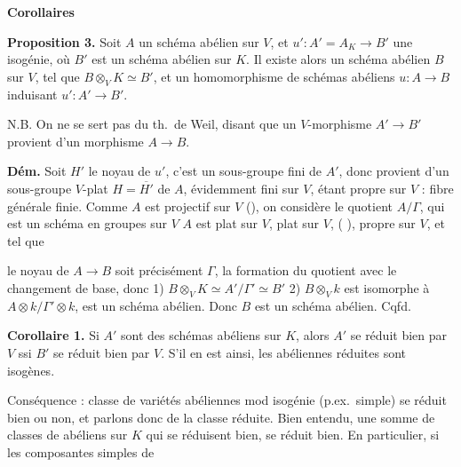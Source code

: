 \documentclass[11pt,a4paper]{article}
\begin{document}
\textbf{Corollaires}

\textbf{Proposition 3.} Soit $A$ un schéma abélien sur $V$, et
$u' \colon A' = A_K \to B'$ une isogénie, où $B'$ est un schéma abélien sur
$K$. Il existe alors un schéma abélien $B$ sur $V$, \struck{\ill{}} tel
que $B \otimes_V K \simeq B'$, et un 
homomorphisme  de schémas abéliens $u \colon A \to B$ induisant
$u' \colon A' \to B'$.

N.B. On ne se sert pas du th.\ de Weil, disant que un $V$-morphisme
 $A' \to B'$ provient d'un morphisme
$A \to B$.

\textbf{Dém.} Soit $H'$ le noyau de $u'$, c'est un sous-groupe fini de
$A'$, donc provient d'un sous-groupe $V$-plat $H = \overline{H'}$ de $A$,
évidemment fini sur $V$, étant propre  sur $V$ : fibre générale finie.
\marginal{\ill{}}
Comme $A$ est projectif sur $V$ (\ill{}), on considère le
 quotient $A/\Gamma$, qui est un schéma en groupes
sur $V$  $A$ est plat sur $V$, plat sur $V$,
( \ill{}), propre sur $V$, et tel que

le noyau de $A \to B$ soit précisément $\Gamma$,
 la formation du quotient  avec le
changement de base, donc 1) $B \otimes_V K \simeq A'/\Gamma' \simeq B'$
2) $B \otimes_V k$ est isomorphe à $A \otimes k / \Gamma' \otimes k$,
 est un schéma abélien. Donc $B$ est un schéma abélien.
Cqfd.

\textbf{Corollaire 1.}  Si $A'$ 
sont des schémas abéliens  sur $K$, alors $A'$
se réduit bien par $V$ ssi $B'$ se réduit bien par $V$. S'il en est ainsi,
les \struck{\ill{}} abéliennes réduites sont isogènes.

 Conséquence :  \ill{}
 classe de variétés abéliennes mod isogénie (p.ex.\
simple) se réduit bien ou non, et \struck{\ill{}} parlons donc de la
\struck{\ill{}} classe réduite. Bien entendu, une somme de classes de
\struck{variétés} \add{interligne : schémas} abéliens sur $K$ qui se
réduisent bien, se réduit bien. En particulier, si les composantes simples
de
\end{document}
